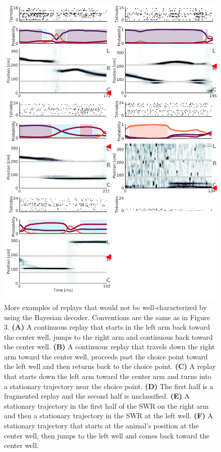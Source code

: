 \documentclass[times, twoside]{zHenriquesLab-StyleBioRxiv}
\begin{document}
\begin{figure}%
\centering
\includegraphics[width=0.80\linewidth]{figures/Figure3-supplemental1/Figure3_v3_supplemental1}
\caption{More examples of replays that would not be well-characterized by using the Bayesian decoder. Conventions are the same as in Figure 3. \textbf{(A)} A continuous replay that starts in the left arm back toward the center well, jumps to the right arm and continuous back toward the center well. \textbf{(B)} A continuous replay that travels down the right arm toward the center well, proceeds past the choice point toward the left well and then returns back to the choice point. \textbf{(C)} A replay that starts down the left arm toward the center arm and turns into a stationary trajectory near the choice point. \textbf{(D)} The first half is a fragmented replay and the second half is unclassified. \textbf{(E)} A stationary trajectory in the first half of the SWR on the right arm and then a stationary trajectory in the SWR at the left well. \textbf{(F)} A stationary trajectory that starts at the animal's position at the center well, then jumps to the left well and comes back toward the center well.
}
\label{fig:Figure3-Figure supplement 1}
\end{figure}
\end{document}
